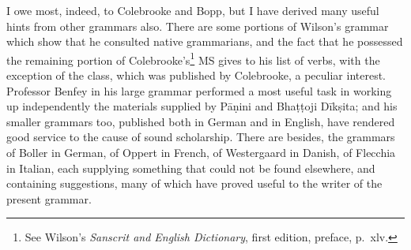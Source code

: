 I owe most, indeed, to Colebrooke and Bopp, but I have derived many
useful hints from other grammars also. There are some portions of
Wilson's grammar which show that he consulted native grammarians, and
the fact that he possessed the remaining portion of
Colebrooke's\footnote{See Wilson's \emph{Sanscrit and English
    Dictionary}, first edition, preface, p.\ xlv.} MS gives to his list
of verbs, with the exception of the  class, which was published
by Colebrooke, a peculiar interest. Professor Benfey in his large
grammar performed a most useful task in working up independently the
materials supplied by Pāṇini and Bhaṭṭoji Dīkṣita; and his smaller
grammars too, published both in German and in English, have rendered
good service to the cause of sound scholarship. There are besides, the
grammars of Boller in German, of Oppert in French, of Westergaard in
Danish, of Flecchia in Italian, each supplying something that could not
be found elsewhere, and containing suggestions, many of which have
proved useful to the writer of the present grammar.

